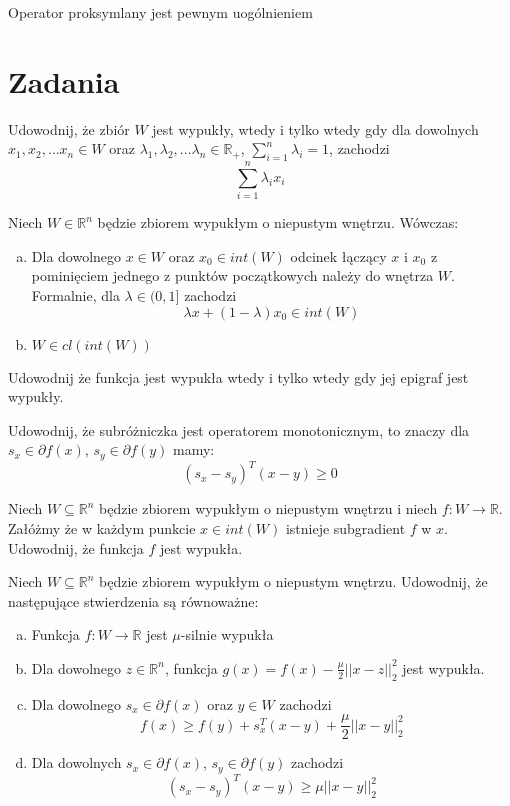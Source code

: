 \documentclass[10pt,a4paper,draft]{report}
\begin{document}
Operator proksymlany jest pewnym uogólnieniem 


\section{Zadania}
\begin{problem}
Udowodnij, że zbiór $W$ jest wypukły, wtedy i tylko wtedy gdy dla dowolnych $x_1, x_2, \ldots x_n \in W$ oraz $\lambda_1, \lambda_2, \ldots \lambda_n \in \mathbb{R}_+$, $\sum_{i=1}^n \lambda_i = 1$, zachodzi
\[
\sum_{i=1}^n \lambda_i x_i
\]
\end{problem}
\begin{problem}
Niech $W \in \mathbb{R}^n$ będzie zbiorem wypukłym o niepustym wnętrzu. Wówczas:
\begin{enumerate}[a)]

\item Dla dowolnego $x \in W$ oraz $x_0 \in int(W)$ odcinek łączący $x$ i $x_0$ z pominięciem jednego z punktów początkowych należy do wnętrza $W$. Formalnie, dla $\lambda \in (0, 1]$ zachodzi
\[
\lambda x + (1 - \lambda) x_0 \in int(W)
\]

\item $W \in cl(int(W))$
\end{enumerate}
\end{problem}
\begin{problem}
Udowodnij że funkcja jest wypukła wtedy i tylko wtedy gdy jej epigraf jest wypukły.
\end{problem}

\begin{problem}
Udowodnij, że subróżniczka jest operatorem monotonicznym, to znaczy dla $s_x \in \partial f(x)$, $s_y \in \partial f(y)$ mamy:
\[
(s_x - s_y)^T (x - y) \geq 0
\]
\end{problem}

\begin{problem}
Niech $W \subseteq \mathbb{R}^n$ będzie zbiorem wypukłym o niepustym wnętrzu i niech $f : W \rightarrow \mathbb{R}$. Załóżmy że w każdym punkcie $x \in int(W)$ istnieje subgradient $f$ w $x$. Udowodnij, że funkcja $f$ jest wypukła.
\end{problem}

\begin{problem}
Niech $W \subseteq \mathbb{R}^n$ będzie zbiorem wypukłym o niepustym wnętrzu. Udowodnij, że następujące stwierdzenia są równoważne:
\begin{enumerate}[a)]
\item Funkcja $f: W \rightarrow \mathbb{R}$ jest $\mu$-silnie wypukła
\item Dla dowolnego $z \in \mathbb{R}^n$, funkcja $g(x) = f(x) - \frac{\mu}{2}||x-z||_2^2$ jest wypukła.
\item Dla dowolnego $s_x \in \partial f(x)$ oraz $y \in W$ zachodzi
\[
f(x) \geq f(y) + s_x^T(x - y) + \frac{\mu}{2} ||x-y||_2^2
\]
\item Dla dowolnych $s_x \in \partial f(x)$, $s_y \in \partial f(y)$ zachodzi
\[
(s_x - s_y)^T (x - y) \geq \mu ||x-y||_2^2
\]
\end{enumerate}
\end{problem}
\end{document}
